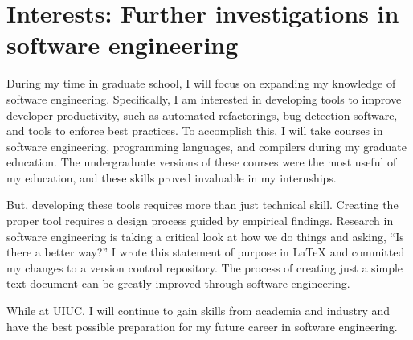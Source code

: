 \section*{Interests: Further investigations in software engineering}
During my time in graduate school, I will focus on expanding my knowledge of software engineering. 
Specifically, I am interested in developing tools to improve developer productivity, such as automated refactorings, bug detection software, and tools to enforce best practices. 
To accomplish this, I will take courses in software engineering, programming languages, and compilers during my graduate education. The undergraduate versions of these courses were the most useful of my education, and these skills proved invaluable in my internships. 

But, developing these tools requires more than just technical skill. 
Creating the proper tool requires a design process guided by empirical findings. Research in software engineering is taking a critical look at how we do things and asking, “Is there a better way?” 
I wrote this statement of purpose in LaTeX and committed my changes to a version control repository. 
The process of creating just a simple text document can be greatly improved through software engineering. 

While at UIUC, I will continue to gain skills from academia and industry and have the best possible preparation for my future career in software engineering.